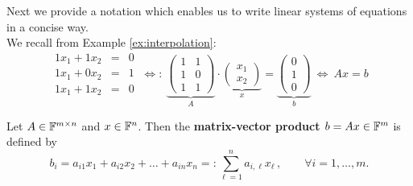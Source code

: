 \begin{frame} 
Next we provide a notation which enables us to write linear systems of equations in a concise way.\\
We recall from Example \ref{ex:interpolation}:
\begin{equation*}
\begin{array}{rcl}
1x_1 + 1x_2 &=&0\\
1x_1 +0x_2 &=&1\\
1x_1 +1x_2 &=&0
\end{array}
\ \Leftrightarrow: \
\underbrace{
	\begin{pmatrix}
	1 & 1 \\ 
	1& 0  \\ 
	1 & 1 
	\end{pmatrix}
}_{A}
\cdot
\underbrace{
	\begin{pmatrix}
	x_1 \\ x_2  
	\end{pmatrix}
}_{x}
=
\underbrace{
	\begin{pmatrix}
	0\\ 1 \\ 0
	\end{pmatrix}
}_{b}
\ \Leftrightarrow \
Ax=b
\end{equation*}
\begin{defi}
 Let $A \in {\mathbb{F}}^{m\times n}$ and $x\in {\mathbb{F}}^n$. Then the \textbf{\color{defgruen} matrix-vector product $b=Ax \in {\mathbb{F}}^m$} is defined by
\[
b_i=a_{i1}x_1+a_{i2}x_2+\ldots +a_{in}x_n=:\sum\limits_{\ell=1}^na_{i,\ell}x_\ell\, ,\qquad \forall i=1,\ldots, m .
\] 		
\end{defi}
\end{frame}


